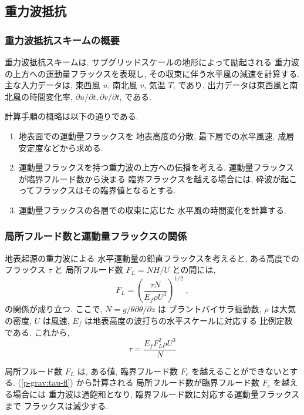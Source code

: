 ﻿
\subsection{重力波抵抗}

\subsubsection{重力波抵抗スキームの概要}

重力波抵抗スキームは,
サブグリッドスケールの地形によって励起される
重力波の上方への運動量フラックスを表現し,
その収束に伴う水平風の減速を計算する.
主な入力データは, 東西風 $u$, 南北風 $v$, 気温 $T$, であり,
出力データは東西風と南北風の時間変化率,
$\partial u/\partial t, \partial v/\partial t$, である.

計算手順の概略は以下の通りである.
%
\begin{enumerate}
\item 地表面での運動量フラックスを
      地表高度の分散, 
      最下層での水平風速, 成層安定度などから求める.
\item 運動量フラックスを持つ重力波の上方への伝播を考える.
      運動量フラックスが臨界フルード数から決まる
      臨界フラックスを越える場合には,
      砕波が起こってフラックスはその臨界値となるとする.
\item 運動量フラックスの各層での収束に応じた
      水平風の時間変化を計算する.
\end{enumerate}

\subsubsection{局所フルード数と運動量フラックスの関係}

地表起源の重力波による
水平運動量の鉛直フラックスを考えると,
ある高度でのフラックス $\tau$ と
局所フルード数 $F_L = NH/U$ との間には,
\begin{equation}
   F_L = \left(
            \frac{\tau N}{E_f \rho U^3}
           \right)^{1/2} \; ,
  \label{p-grav:tau-fl}
\end{equation}
の関係が成り立つ.
ここで, $N = g/\theta \partial \theta/\partial z$ は
ブラントバイサラ振動数, 
$\rho$ は大気の密度, 
$U$ は風速, $E_f$ は地表高度の波打ちの水平スケールに対応する
比例定数である.
これから,
\begin{equation}
  \tau = \frac{E_f F_L^2 \rho U^3}{N}
\label{p-grav:fl-tau}
\end{equation}

局所フルード数 $F_L$ は,
ある値, 臨界フルード数 $F_{c}$ を越えることができないとする.
(\ref{p-grav:tau-fl}) から計算される
局所フルード数が臨界フルード数 $F_{c}$ を越える場合には
重力波は過飽和となり,
臨界フルード数に対応する運動量フラックスまで
フラックスは減少する.


